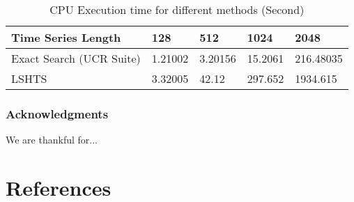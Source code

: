 \documentclass{article}
\begin{document}
\begin{table}[t]
  \caption{CPU Execution time for different methods (Second)}
  \label{time_random}
  \centering
  \begin{tabular}{lllll}
    \toprule
    Time Series Length     & 128     & 512  & 1024  & 2048\\
    \midrule
    Exact Search (UCR Suite) & 1.21002  & 3.20156 & 15.2061 & 216.48035     \\
    LSHTS &  3.32005  & 42.12  &  297.652 & 1934.615     \\
    \bottomrule
  \end{tabular}
\end{table}

\subsubsection*{Acknowledgments}

We are thankful for...

\section*{References}
\small




%
%
\end{document}
